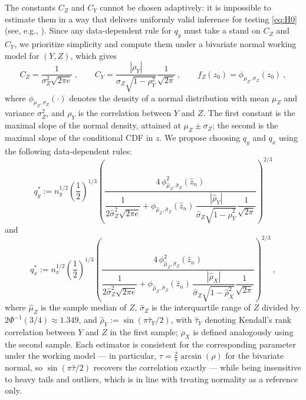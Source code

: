 \documentclass[11pt]{article}
\numberwithin{equation}{section}
\begin{document}
The constants $C_Z$ and $C_Y$ cannot be chosen adaptively: it is impossible to estimate them in a way that delivers uniformly valid inference for testing \eqref{eq:H0} (see, e.g., \citealp{armstrong/kolesar:18}). Since any data-dependent rule for $q_y$ must take a stand on $C_Z$ and $C_Y$, we prioritize simplicity and compute them under a bivariate normal working model for $(Y,Z)$, which gives
\begin{equation*}
 C_Z = \frac{1}{\sigma_Z^2 \sqrt{2\pi e}}~, \qquad C_Y = \frac{|\rho_Y|}{\sigma_Z \sqrt{1-\rho_Y^2}} \frac{1}{\sqrt{2\pi}}~, \qquad f_Z(z_0) = \phi_{\mu_Z,\sigma_Z}(z_0)~,
\end{equation*}
where $\phi_{\mu_Z,\sigma_Z}(\cdot)$ denotes the density of a normal distribution with mean $\mu_Z$ and variance $\sigma_Z^2$, and $\rho_Y$ is the correlation between $Y$ and $Z$. The first constant is the maximal slope of the normal density, attained at $\mu_Z \pm \sigma_Z$; the second is the maximal slope of the conditional CDF in $z$. We propose choosing $q_y$ and $q_x$ using the following data-dependent rules:
\begin{equation}\label{eq:rot-qy}
 q_y^* := n_y^{1/2} \left(\frac{1}{2}\right)^{1/3} \left( \frac{4\, \phi^2_{\hat\mu_Z,\hat\sigma_Z}(\hat z_n)} {\dfrac{1}{2\hat\sigma_Z^2\sqrt{2\pi e}} + \phi_{\hat\mu_Z,\hat\sigma_Z}(\hat z_n)\,\dfrac{|\hat\rho_Y|}{\hat\sigma_Z\sqrt{1-\hat\rho_Y^2}} \dfrac{1}{\sqrt{2\pi}}} \right)^{2/3}
\end{equation}
and
\begin{equation}\label{eq:rot-qx}
 q_x^* := n_x^{1/2} \left(\frac{1}{2}\right)^{1/3} \left( \frac{4\, \phi^2_{\hat\mu_Z,\hat\sigma_Z}(\hat z_n)} {\dfrac{1}{2\hat\sigma_Z^2\sqrt{2\pi e}} + \phi_{\hat\mu_Z,\hat\sigma_Z}(\hat z_n)\,\dfrac{|\hat\rho_X|}{\hat\sigma_Z\sqrt{1-\hat\rho_X^2}} \dfrac{1}{\sqrt{2\pi}}} \right)^{2/3}~,
\end{equation}
where $\hat\mu_Z$ is the sample median of $Z$, $\hat\sigma_Z$ is the interquartile range of $Z$ divided by $2\Phi^{-1}(3/4) \approx 1.349$, and $\hat\rho_Y := \sin(\pi \hat\tau_Y/2)$, with $\hat\tau_Y$ denoting Kendall's rank correlation between $Y$ and $Z$ in the first sample; $\hat\rho_X$ is defined analogously using the second sample. Each estimator is consistent for the corresponding parameter under the working model --- in particular, $\tau = \frac{2}{\pi}\arcsin(\rho)$ for the bivariate normal, so $\sin(\pi\hat\tau/2)$ recovers the correlation exactly --- while being insensitive to heavy tails and outliers, which is in line with treating normality as a reference only.
\end{document}
